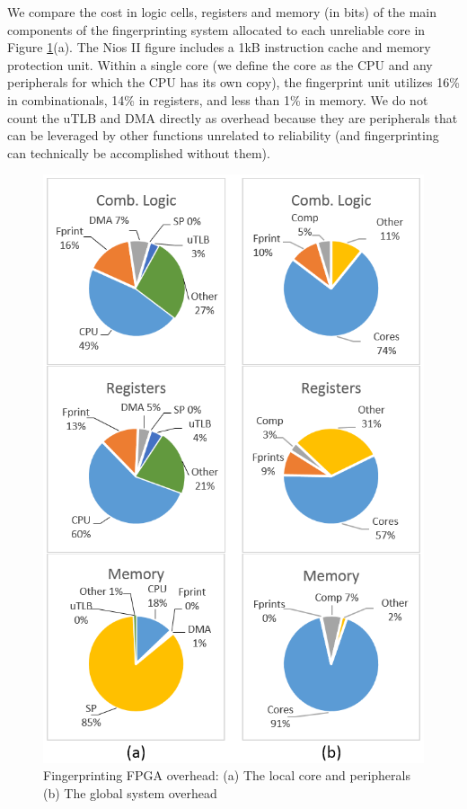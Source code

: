 	We compare the cost in logic cells, registers and memory (in bits) of the main components of the fingerprinting system allocated to each unreliable core in Figure \ref{f:pie}(a).
	The Nios II figure includes a 1kB instruction cache and memory protection unit.
	Within a single core (we define the core as the CPU and any peripherals for which the CPU has its own copy), the fingerprint unit utilizes 16\% in combinationals, 14\% in registers, and less than 1\% in memory. We do not count the uTLB and DMA directly as overhead because they are peripherals that can be leveraged by other functions unrelated to reliability (and fingerprinting can technically be accomplished without them).

\begin{figure}[tb]
\centering
\includegraphics[scale=0.5]{figures/pie.png}
\caption[Fingerprinting FPGA resource allocation]{Fingerprinting FPGA overhead: (a) The local core and peripherals (b) The global system overhead}
\label{f:pie}
\end{figure}

